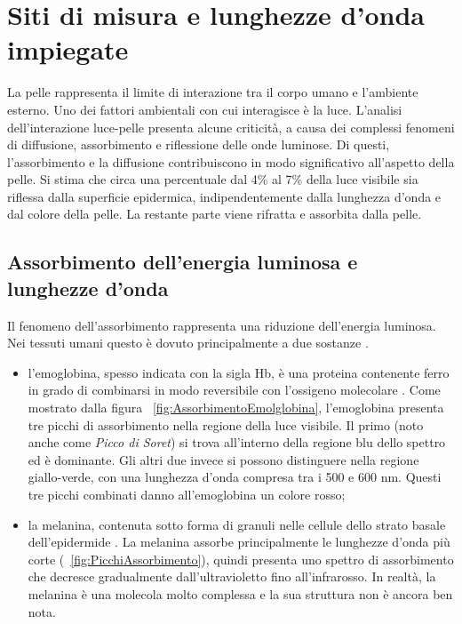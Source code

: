 \section{Siti di misura e lunghezze d'onda impiegate}
La pelle rappresenta il limite di interazione tra il corpo umano e l'ambiente esterno. Uno dei fattori ambientali con cui interagisce è la luce. L'analisi dell'interazione luce-pelle presenta alcune criticità, a causa dei complessi fenomeni di diffusione, assorbimento e riflessione  delle onde luminose. Di questi, l'assorbimento e la diffusione contribuiscono in modo significativo all'aspetto della pelle. Si stima che circa una percentuale dal 4\% al 7\% della luce visibile sia riflessa dalla superficie epidermica, indipendentemente dalla lunghezza d'onda e dal colore della pelle. La restante parte viene rifratta e assorbita dalla pelle. 
\subsection{Assorbimento dell'energia luminosa e lunghezze d'onda}
Il fenomeno dell'assorbimento rappresenta una riduzione dell'energia luminosa. Nei tessuti umani questo è dovuto principalmente a due sostanze \cite{Lister2012}.
\begin{itemize}
\item l'emoglobina, spesso indicata con la sigla Hb, è una proteina contenente ferro in grado di combinarsi in modo reversibile con l’ossigeno molecolare \cite{SilverthornDeeUnglaub2020Fu:u}. Come mostrato dalla figura \Fig~\ref{fig:AssorbimentoEmolglobina}, l'emoglobina presenta tre picchi di assorbimento nella regione della luce visibile. Il primo (noto anche come \textit{Picco di Soret}) si trova all'interno della regione blu dello spettro ed è dominante. Gli altri due invece si possono distinguere nella regione giallo-verde, con una lunghezza d'onda compresa tra i 500 e 600 nm. Questi tre picchi combinati danno all'emoglobina un colore rosso;
\item la melanina, contenuta sotto forma di granuli nelle cellule dello strato basale dell’epidermide \cite{SilverthornDeeUnglaub2020Fu:u}. La melanina assorbe principalmente le lunghezze d'onda più corte (\Fig~\ref{fig:PicchiAssorbimento}), quindi presenta uno spettro di assorbimento che decresce gradualmente dall'ultravioletto fino all'infrarosso. In realtà, la melanina è una molecola molto complessa e la sua struttura non è ancora ben nota.
\end{itemize}
